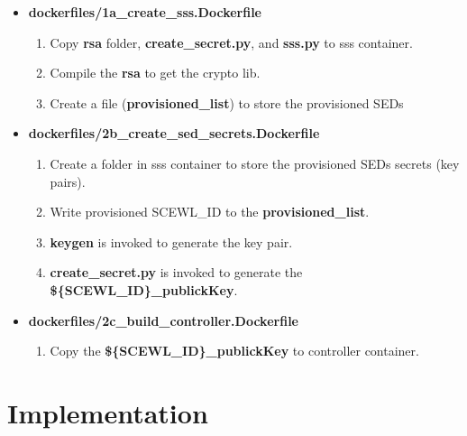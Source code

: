 \documentclass[11pt,oneside,onecolumn,letterpaper]{article}
\begin{document}
  \begin{itemize}
    \item \textbf{dockerfiles/1a\_create\_sss.Dockerfile}
    \begin{enumerate}
      \item Copy \textbf{rsa} folder, \textbf{create\_secret.py}, and \textbf{sss.py} to sss container.
      \item Compile the \textbf{rsa} to get the crypto lib.
      \item Create a file (\textbf{provisioned\_list}) to store the provisioned SEDs
    \end{enumerate}
    \item \textbf{dockerfiles/2b\_create\_sed\_secrets.Dockerfile}
    \begin{enumerate}
      \item Create a folder in sss container to store the provisioned SEDs secrets (key pairs).
      \item Write provisioned SCEWL\_ID to the \textbf{provisioned\_list}.
      \item \textbf{keygen} is invoked to generate the key pair.
      \item \textbf{create\_secret.py} is invoked to generate the \textbf{\$\{SCEWL\_ID\}\_publickKey}.
    \end{enumerate}
    \item \textbf{dockerfiles/2c\_build\_controller.Dockerfile}
    \begin{enumerate}
      \item Copy the \textbf{\$\{SCEWL\_ID\}\_publickKey} to controller container.
    \end{enumerate}
  \end{itemize}

\section{Implementation}
\end{document}
